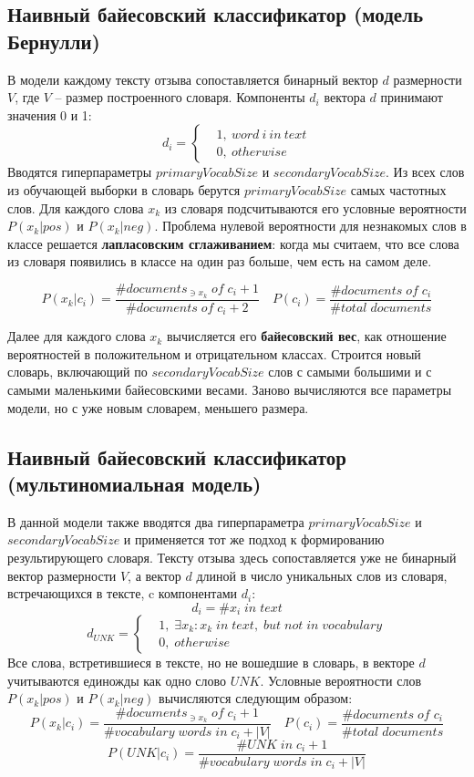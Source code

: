 \subsection{Наивный байесовский классификатор (модель Бернулли)}
В модели каждому тексту отзыва сопоставляется бинарный вектор $d$ размерности $V$, где $V$ -- размер построенного словаря. Компоненты $d_i$ вектора $d$ принимают значения 0 и 1:
$$
	d_i = \left\{\begin{aligned}
	& 1, \: word \: i \: in \: text \\
	& 0, \: otherwise
	\end{aligned}\right.
$$
Вводятся гиперпараметры $primaryVocabSize$ и $secondaryVocabSize$. Из всех слов из обучающей выборки в словарь берутся $primaryVocabSize$ самых частотных слов. Для каждого слова $x_k$ из словаря подсчитываются его условные вероятности $P(x_k|pos)$ и $P(x_k|neg)$. Проблема нулевой вероятности для незнакомых слов в классе решается {\bf лапласовским сглаживанием}: когда мы считаем, что все слова из словаря появились в классе на один раз больше, чем есть на самом деле.

$$
	P(x_k|c_i) = \frac{\# documents_{\ni x_k} \; of \; c_i + 1}{\# documents \; of \; c_i + 2} \quad P(c_i) = \frac{\# documents \; of \; c_i}{\#total \; documents}
$$

Далее для каждого слова $x_k$ вычисляется его {\bf байесовский вес}, как отношение вероятностей в положительном и отрицательном классах. Строится новый словарь, включающий по $secondaryVocabSize$ слов с самыми большими и с самыми маленькими байесовскими весами. Заново вычисляются все параметры модели, но с уже новым словарем, меньшего размера.

\subsection{Наивный байесовский классификатор (мультиномиальная модель)}
В данной модели также вводятся два гиперпараметра $primaryVocabSize$ и $secondaryVocabSize$ и применяется тот же подход к формированию результирующего словаря. Тексту отзыва здесь сопоставляется уже не бинарный вектор размерности $V$, а вектор $d$ длиной в число уникальных слов из словаря, встречающихся в тексте, c компонентами $d_i$:
$$
	d_i = \# x_i \; in \; text
$$
$$
	d_{UNK} = \left\{
				\begin{aligned}
				& 1, \; \exists x_k: x_k \; in \; text, \; but \; not \; in \; vocabulary \\
				& 0, \; otherwise
				\end{aligned}
			\right.
$$
Все слова, встретившиеся в тексте, но не вошедшие в словарь, в векторе $d$ учитываются единожды как одно слово $UNK$.
Условные вероятности слов $P(x_k|pos)$ и $P(x_k|neg)$ вычисляются следующим образом:
$$
P(x_k|c_i) = \frac{\# documents_{\ni x_k} \; of \; c_i + 1}{\# vocabulary \; words \; in \; c_i + |V|} \quad P(c_i) = \frac{\# documents \; of \; c_i}{\#total \; documents}
$$
$$
P(UNK|c_i) = \frac{\# UNK \; in \; c_i + 1}{\# vocabulary \; words \; in \; c_i + |V|}
$$

